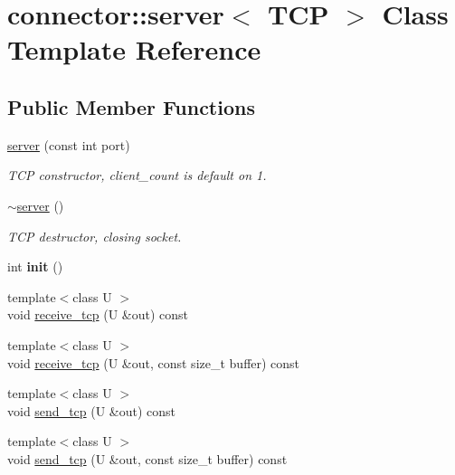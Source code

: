 \hypertarget{classconnector_1_1server_3_01TCP_01_4}{}\section{connector\+:\+:server$<$ T\+CP $>$ Class Template Reference}
\label{classconnector_1_1server_3_01TCP_01_4}
\subsection*{Public Member Functions}
\begin{DoxyCompactItemize}
\item 
\mbox{\label{classconnector_1_1server_3_01TCP_01_4_ad1e9a8c5f732085dc8fac2587655318f}} 
\hyperlink{classconnector_1_1server_3_01TCP_01_4_ad1e9a8c5f732085dc8fac2587655318f}{server} (const int port)
\begin{DoxyCompactList}\small\item\em T\+CP constructor, client\+\_\+count is default on 1. \end{DoxyCompactList}\item 
\mbox{\label{classconnector_1_1server_3_01TCP_01_4_a3a8736787179196e4ccb3919bc0d3859}} 
\hyperlink{classconnector_1_1server_3_01TCP_01_4_a3a8736787179196e4ccb3919bc0d3859}{$\sim$server} ()
\begin{DoxyCompactList}\small\item\em T\+CP destructor, closing socket. \end{DoxyCompactList}\item 
\mbox{\label{classconnector_1_1server_3_01TCP_01_4_ad34dbf3be1f0ce4460dc38c54d282061}} 
int {\bfseries init} ()
\item 
{\footnotesize template$<$class U $>$ }\\void \hyperlink{classconnector_1_1server_3_01TCP_01_4_a1e7fcee84fd01215a02cf78a958ca29b}{receive\+\_\+tcp} (U \&out) const
\item 
{\footnotesize template$<$class U $>$ }\\void \hyperlink{classconnector_1_1server_3_01TCP_01_4_a36ad727f7f1c4f017b7c2faab0ad6b8d}{receive\+\_\+tcp} (U \&out, const size\+\_\+t buffer) const
\item 
{\footnotesize template$<$class U $>$ }\\void \hyperlink{classconnector_1_1server_3_01TCP_01_4_aacfd27c6a4e59793c4440b8f3030e811}{send\+\_\+tcp} (U \&out) const
\item 
{\footnotesize template$<$class U $>$ }\\void \hyperlink{classconnector_1_1server_3_01TCP_01_4_a89afed1ab41b02c9eb39bd617787a1f3}{send\+\_\+tcp} (U \&out, const size\+\_\+t buffer) const
\end{DoxyCompactItemize}
